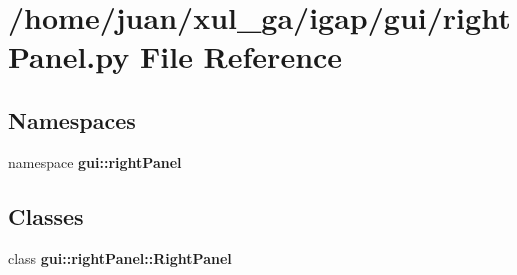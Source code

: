 \section{/home/juan/xul\_\-ga/igap/gui/rightPanel.py File Reference}
\label{rightPanel_8py}
\subsection*{Namespaces}
\begin{CompactItemize}
\item 
namespace {\bf gui::rightPanel}
\end{CompactItemize}
\subsection*{Classes}
\begin{CompactItemize}
\item 
class {\bf gui::rightPanel::RightPanel}
\end{CompactItemize}
